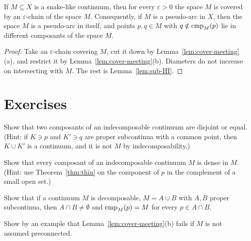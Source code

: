 
\begin{corollary}\label{cor:sub-snake}
If $M\subseteq X$ is a snake-like continuum, then for every $\varepsilon>0$ the space $M$ is covered
by an $\varepsilon$-chain of the space $M$. Consequently, if $M$ is a pseudo-arc in $X$, then the
space $M$ is a pseudo-arc in itself, and points $p,q\in M$ with $q\notin\operatorname{cmp}_{M}(p)$ lie in different
composants of the space $M$.
\end{corollary}

\begin{proof}
Take an $\varepsilon$-chain covering $M$, cut it down by Lemma~\ref{lem:cover-meeting}(a), and restrict
it by Lemma~\ref{lem:cover-meeting}(b). Diameters do not increase on intersecting with $M$. The rest
is Lemma~\ref{lem:sub-HI}.
\end{proof}


\section*{Exercises}

\begin{exercise}
Show that two composants of an indecomposable continuum are disjoint or equal. (Hint: if $K\ni p$ and
$K'\ni q$ are proper subcontinua with a common point, then $K\cup K'$ is a continuum, and it is not
$M$ by indecomposability.)
\end{exercise}

\begin{exercise}
Show that every composant of an indecomposable continuum $M$ is dense in $M$. (Hint: use
Theorem~\ref{thm:thin} on the component of $p$ in the complement of a small open set.)
\end{exercise}

\begin{exercise}
Show that if a continuum $M$ is decomposable, $M=A\cup B$ with $A,B$ proper subcontinua, then
$A\cap B\neq\emptyset$ and $\operatorname{cmp}_{M}(p)=M$ for every $p\in A\cap B$.
\end{exercise}

\begin{exercise}
Show by an example that Lemma~\ref{lem:cover-meeting}(b) fails if $M$ is not assumed preconnected.
\end{exercise}
